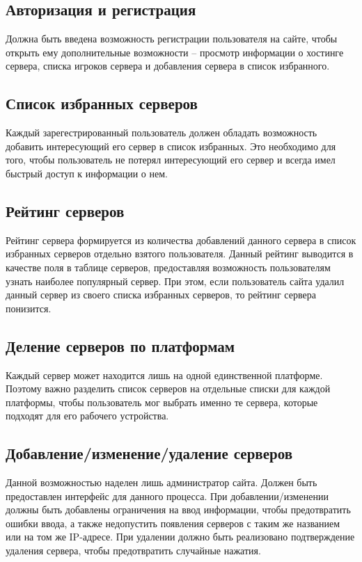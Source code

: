 \subsection{Авторизация и регистрация}

Должна быть введена возможность регистрации пользователя на сайте, чтобы открыть ему дополнительные возможности -- просмотр информации о хостинге сервера, списка игроков сервера и добавления сервера в список избранного.


\subsection{Список избранных серверов}

Каждый зарегестрированный пользователь должен обладать возможность добавить интересующий его сервер в список избранных. Это необходимо для того, чтобы пользователь не потерял интересующий его сервер и всегда имел быстрый доступ к информации о нем.


\subsection{Рейтинг серверов}

Рейтинг сервера формируется из количества добавлений данного сервера в список избранных серверов отдельно взятого пользователя. Данный рейтинг выводится в качестве поля в таблице серверов, предоставляя возможность пользователям узнать наиболее популярный сервер. При этом, если пользователь сайта удалил данный сервер из своего списка избранных серверов, то рейтинг сервера понизится.


\subsection{Деление серверов по платформам}

Каждый сервер может находится лишь на одной единственной платформе. Поэтому важно разделить список серверов на отдельные списки для каждой платформы, чтобы пользователь мог выбрать именно те сервера, которые подходят для его рабочего устройства.


\subsection{Добавление/изменение/удаление серверов}

Данной возможностью наделен лишь администратор сайта. Должен быть предоставлен интерфейс для данного процесса. При добавлении/изменении должны быть добавлены ограничения на ввод информации, чтобы предотвратить ошибки ввода, а также недопустить появления серверов с таким же названием или на том же IP-адресе. При удалении должно быть реализовано подтверждение удаления сервера, чтобы предотвратить случайные нажатия.


